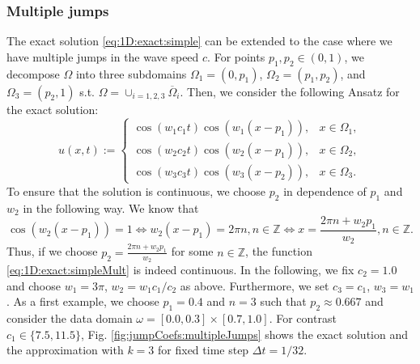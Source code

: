 \documentclass[sn-mathphys-num]{sn-jnl}
\numberwithin{equation}{section}
\begin{document}
\begin{comment}
                \addplot[gray, dashed, domain=1:4] {0.03*(1/2^(-2))^(x-0.9)};
                \addplot[gray, dashed, domain=1:4] {0.003*(1/2^(-2))^(x-0.9)};
                
    
                \legend{$k=2 \quad L = 4$, $k = 3 \quad L = 4$, $e^\Lambda$ (rescaled)}
            \end{groupplot}
        \end{tikzpicture}
    \end{center}
    \caption{Filippas lambda...}
  \end{figure}
\end{comment}



\subsubsection{Multiple jumps}
\noindent The exact solution \eqref{eq:1D:exact:simple} can be extended to the case where we have multiple jumps in the wave speed $c$. For points $p_1,p_2 \in (0,1)$, we decompose $\Omega$ into three subdomains $\Omega_1 = (0,p_1)$, $\Omega_2 = (p_1,p_2)$, and $\Omega_3 = (p_2,1)$ s.t. $\Omega = \cup_{i = 1,2,3} \overline{\Omega}_i$. Then, we consider the following Ansatz for the exact solution: 
\begin{equation}\label{eq:1D:exact:simpleMult}
    u(x,t) := \begin{cases}
        \cos(w_1 c_1 t) \cos(w_1(x-p_1)), & x \in \Omega_1, \\
        \cos(w_2 c_2 t) \cos(w_2(x-p_1)), & x \in \Omega_2, \\
        \cos(w_3 c_3 t) \cos(w_3(x-p_2)), & x \in \Omega_3. 
    \end{cases}
\end{equation}
To ensure that the solution is continuous, we choose $p_2$ in dependence of $p_1$ and $w_2$ in the following way. We know that 
\begin{equation*}
    \cos(w_2(x-p_1)) = 1 \Leftrightarrow w_2(x-p_1) = 2 \pi n, n \in \mathbb{Z} \Leftrightarrow x = \frac{2 \pi n + w_2 p_1}{w_2}, n \in \mathbb{Z}. 
\end{equation*}
Thus, if we choose $p_2 = \frac{2 \pi n + w_2 p_1}{w_2}$ for some $n \in \mathbb{Z}$, the function \eqref{eq:1D:exact:simpleMult} is indeed continuous.  
In the following, we fix $c_2 = 1.0$ and choose $w_1 = 3 \pi$, $w_2 = w_1 c_1/c_2$ as above. Furthermore, we set $c_3 = c_1$, $w_3 = w_1$. 
As a first example, we choose $p_1 = 0.4$ and $n = 3$ such that $p_2 \approx 0.667$ and consider the data domain $\omega = [0.0,0.3] \times [0.7,1.0]$. For contrast $c_1 \in \{ 7.5,11.5 \}$, Fig. \ref{fig:jumpCoefs:multipleJumps} shows the exact solution and the approximation with $k = 3$ for fixed time step $\Delta t = 1/32$. 
\end{document}
